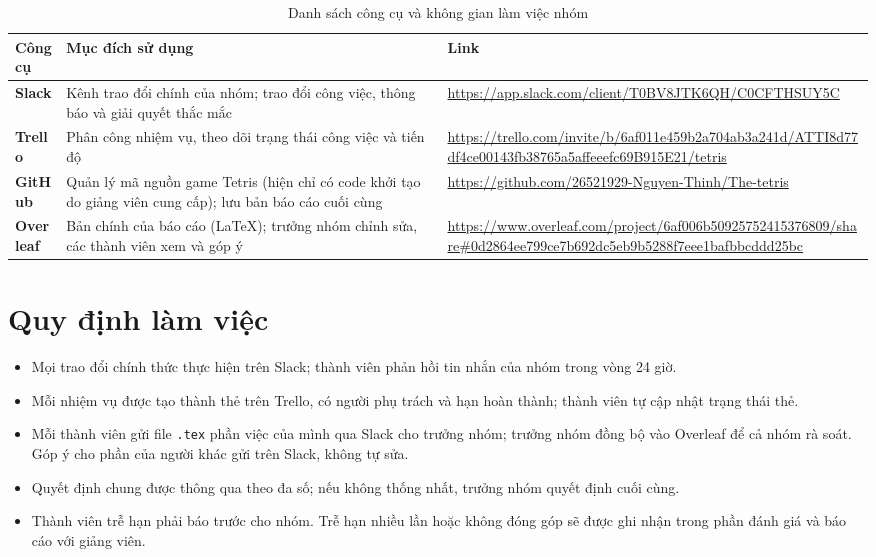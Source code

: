 \documentclass[12pt,a4paper,oneside]{report}
\begin{document}
\begin{table}[H]
\centering
\caption{Danh sách công cụ và không gian làm việc nhóm}\label{tab:cong_cu_lam_viec}
\renewcommand{\arraystretch}{1.55}
\begin{tabular}{|>{\raggedright\arraybackslash}p{2.5cm}|>{\raggedright\arraybackslash}p{6.2cm}|>{\raggedright\arraybackslash}p{5.5cm}|}
\hline
\textbf{Công cụ} & \textbf{Mục đích sử dụng} & \textbf{Link} \\ \hline
\textbf{Slack} &
Kênh trao đổi chính của nhóm; trao đổi công việc, thông báo và giải quyết thắc mắc &
\url{https://app.slack.com/client/T0BV8JTK6QH/C0CFTHSUY5C} \\ \hline
\textbf{Trello} &
Phân công nhiệm vụ, theo dõi trạng thái công việc và tiến độ &
\url{https://trello.com/invite/b/6af011e459b2a704ab3a241d/ATTI8d77df4ce00143fb38765a5affeeefc69B915E21/tetris} \\ \hline
\textbf{GitHub} &
Quản lý mã nguồn game Tetris (hiện chỉ có code khởi tạo do giảng viên cung cấp); lưu bản báo cáo cuối cùng &
\url{https://github.com/26521929-Nguyen-Thinh/The-tetris} \\ \hline
\textbf{Overleaf} &
Bản chính của báo cáo (LaTeX); trưởng nhóm chỉnh sửa, các thành viên xem và góp ý &
\url{https://www.overleaf.com/project/6af006b50925752415376809/share#0d2864ee799ce7b692dc5eb9b5288f7eee1bafbbcddd25bc} \\ \hline
\end{tabular}
\end{table}

\section{Quy định làm việc}

\begin{itemize}
    \item Mọi trao đổi chính thức thực hiện trên Slack; thành viên phản hồi tin nhắn của nhóm trong vòng 24 giờ.
    \item Mỗi nhiệm vụ được tạo thành thẻ trên Trello, có người phụ trách và hạn hoàn thành; thành viên tự cập nhật trạng thái thẻ.
    \item Mỗi thành viên gửi file \texttt{.tex} phần việc của mình qua Slack cho trưởng nhóm; trưởng nhóm đồng bộ vào Overleaf để cả nhóm rà soát. Góp ý cho phần của người khác gửi trên Slack, không tự sửa.
    \item Quyết định chung được thông qua theo đa số; nếu không thống nhất, trưởng nhóm quyết định cuối cùng.
    \item Thành viên trễ hạn phải báo trước cho nhóm. Trễ hạn nhiều lần hoặc không đóng góp sẽ được ghi nhận trong phần đánh giá và báo cáo với giảng viên.
\end{itemize}
\end{document}
